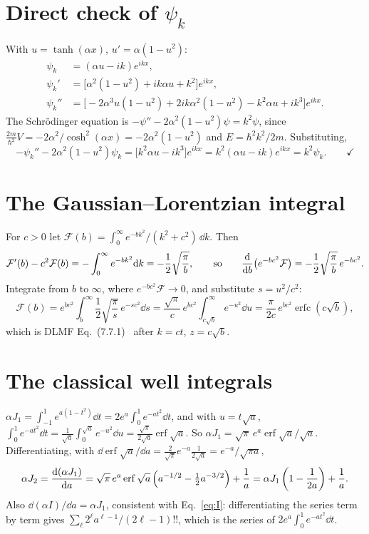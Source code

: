 \documentclass[11pt]{article}
\numberwithin{equation}{section}
\providecommand{\erf}{\operatorname{erf}}
\providecommand{\erfc}{\operatorname{erfc}}
\begin{document}
\appendix
\section{Direct check of \texorpdfstring{$\psi_k$}{psi\_k}}
\label{app:check}
With $u=\tanh(\alpha x)$, $u'=\alpha(1-u^2)$:
\begin{align*}
\psi_k&=(\alpha u-ik)e^{ikx},\\
\psi_k'&=\big[\alpha^2(1-u^2)+ik\alpha u+k^2\big]e^{ikx},\\
\psi_k''&=\big[-2\alpha^3u(1-u^2)+2ik\alpha^2(1-u^2)-k^2\alpha u+ik^3\big]e^{ikx}.
\end{align*}
The Schr\"odinger equation is $-\psi''-2\alpha^2(1-u^2)\psi=k^2\psi$, since $\frac{2m}{\hbar^2}V=-2\alpha^2/\cosh^2(\alpha x)=-2\alpha^2(1-u^2)$ and $E=\hbar^2k^2/2m$. Substituting,
\[
-\psi_k''-2\alpha^2(1-u^2)\psi_k=\big[k^2\alpha u-ik^3\big]e^{ikx}=k^2(\alpha u-ik)e^{ikx}=k^2\psi_k .\qquad\checkmark
\]

\section{The Gaussian--Lorentzian integral}
\label{app:gaussint}
For $c>0$ let $\mathcal F(b)=\int_0^\infty e^{-bk^2}/(k^2+c^2)\,\dd k$. Then
\[
\mathcal F'(b)-c^2\mathcal F(b)=-\int_0^\infty e^{-bk^2}\dd k=-\frac12\sqrt{\frac{\pi}{b}},
\qquad\text{so}\qquad
\dv{b}\big(e^{-bc^2}\mathcal F\big)=-\frac12\sqrt{\frac\pi b}\,e^{-bc^2}.
\]
Integrate from $b$ to $\infty$, where $e^{-bc^2}\mathcal F\to0$, and substitute $s=u^2/c^2$:
\[
\mathcal F(b)=e^{bc^2}\int_b^\infty\frac12\sqrt{\frac\pi s}\,e^{-sc^2}\dd s=\frac{\sqrt\pi}{c}\,e^{bc^2}\int_{c\sqrt b}^\infty e^{-u^2}\dd u=\frac{\pi}{2c}\,e^{bc^2}\erfc\!\left(c\sqrt b\right),
\]
which is DLMF Eq.~(7.7.1)~\cite{dlmf} after $k=ct$, $z=c\sqrt b$.

\section{The classical well integrals}
\label{app:classint}
$\alpha J_1=\int_{-1}^1e^{a(1-t^2)}\dd t=2e^a\int_0^1e^{-at^2}\dd t$, and with $u=t\sqrt a$, $\int_0^1e^{-at^2}\dd t=\frac{1}{\sqrt a}\int_0^{\sqrt a}e^{-u^2}\dd u=\frac{\sqrt\pi}{2\sqrt a}\erf\sqrt a$. So $\alpha J_1=\sqrt\pi\,e^a\erf\sqrt a/\sqrt a$. Differentiating, with $\dd\erf\sqrt a/\dd a=\frac{2}{\sqrt\pi}e^{-a}\frac{1}{2\sqrt a}=e^{-a}/\sqrt{\pi a}$,
\[
\alpha J_2=\dv{(\alpha J_1)}{a}=\sqrt\pi\,e^a\erf\sqrt a\left(a^{-1/2}-\tfrac12a^{-3/2}\right)+\frac1a=\alpha J_1\left(1-\frac1{2a}\right)+\frac1a .
\]
Also $\dd(\alpha I)/\dd a=\alpha J_1$, consistent with Eq.~\eqref{eq:I}: differentiating the series term by term gives $\sum_\ell 2^\ell a^{\ell-1}/(2\ell-1)!!$, which is the series of $2e^a\int_0^1e^{-at^2}\dd t$.
\end{document}
